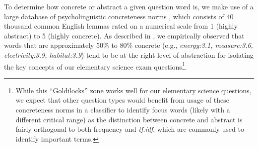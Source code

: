 To determine how concrete or abstract a given question word is, we make use of a large database of psycholinguistic concreteness norms \citep{brysbaert:2014}, which consists of 40 thousand common English lemmas rated on a numerical scale from 1 (highly abstract) to 5 (highly concrete).  As described in \citet{jansen2017framing}, we empirically observed that words that are approximately 50\% to 80\% concrete (e.g., \emph{energy:3.1, measure:3.6, electricity:3.9, habitat:3.9}) tend to be at the right level of abstraction for isolating the key concepts of our elementary science exam questions\footnote{While this  ``Goldilocks'' zone works well for our elementary science questions, we expect that other question types would benefit from usage of these concreteness norms in a classifier to identify focus words (likely with a different critical range) as the distinction between concrete and abstract is fairly orthogonal to both frequency and \textit{tf.idf}, which are commonly used to identify important terms.}.



